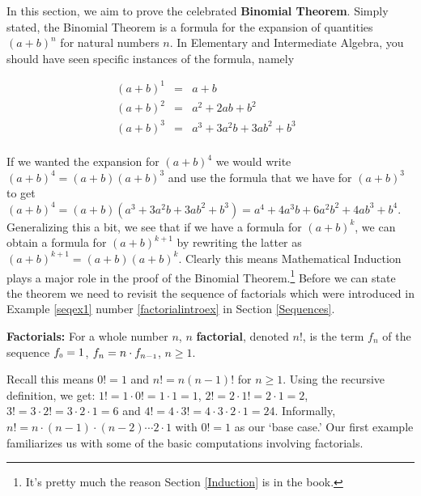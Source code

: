 

\setcounter{footnote}{0}

\label{Binomial}

In this section, we aim to prove the celebrated \textbf{Binomial Theorem}.  Simply stated, the Binomial Theorem is a formula for the expansion of quantities $(a+b)^n$ for natural numbers $n$.  In Elementary and Intermediate Algebra, you should have seen specific instances of the formula, namely

\[ \begin{array}{rclr}

(a+b)^1 & = & a + b & \\
(a+b)^2 & = & a^2 + 2ab + b^2 & \\
(a+b)^3 & = & a^3 + 3a^2 b + 3ab^2 + b^3 & \\
\end{array}\]

If we wanted the expansion for $(a+b)^4$ we would write $(a+b)^4 = (a+b)(a+b)^3$ and use the formula that we have for $(a+b)^3$ to get $(a+b)^4 = (a+b) \left( a^3 + 3a^2 b + 3ab^2 + b^3 \right) = a^4 + 4a^3b + 6a^2b^2 + 4ab^3 + b^4$.  Generalizing this a bit, we see that if we have a formula for $(a+b)^{k}$, we can obtain a formula for $(a+b)^{k+1}$ by rewriting the latter as $(a+b)^{k+1} = (a+b)(a+b)^{k}$.  Clearly this means Mathematical Induction plays a major role in the proof of the Binomial Theorem.\footnote{It's pretty much the reason Section \ref{Induction} is in the book.}  Before we can state the theorem we need to revisit the sequence of factorials which were introduced in Example \ref{seqex1} number \ref{factorialintroex} in Section \ref{Sequences}.

\medskip

\colorbox{ResultColor}{\bbm 

\begin{defn}  \label{factorialdefn}  \textbf{Factorials:}  For a whole number $n$,  {\boldmath $n$} \textbf{factorial}, denoted $n!$,  is the term $f_{n}$ of the sequence $f_{\mbox{\tiny$0$}} = 1$, $f_{n} =n \cdot f_{n-\mbox{\tiny$1$}}$, $n \geq 1$.  


\end{defn}

\ebm}


\medskip

Recall this means $0! = 1$ and $n! = n(n-1)!$ for $n \geq 1$.  Using the recursive definition, we get: $1! = 1 \cdot 0! = 1 \cdot 1 = 1$, $2! = 2 \cdot 1! = 2 \cdot 1 = 2$, $3! = 3 \cdot 2! = 3 \cdot 2 \cdot 1 = 6$ and  $4! = 4 \cdot 3! = 4 \cdot 3 \cdot 2 \cdot 1 = 24$.  Informally, $n! = n\cdot(n -1)\cdot(n -2) \cdots 2 \cdot 1$ with $0! = 1$ as our `base case.'  Our first example familiarizes us with some of the basic computations involving factorials.

